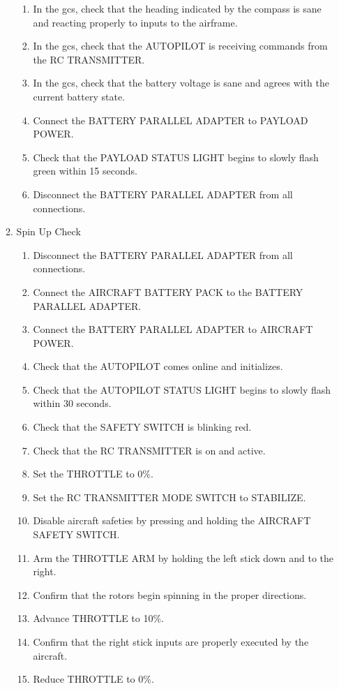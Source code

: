 \documentclass{report}
\begin{document}
\begin{enumerate}
\begin{enumerate}
\begin{enumerate}
							\item In the \gls{gcs}, check that the heading indicated by the compass is sane and reacting properly to inputs to the airframe.
							\item In the \gls{gcs}, check that the AUTOPILOT is receiving commands from the RC TRANSMITTER.
							\item In the \gls{gcs}, check that the battery voltage is sane and agrees with the current battery state.
							\item Connect the BATTERY PARALLEL ADAPTER to PAYLOAD POWER.
							\item Check that the PAYLOAD STATUS LIGHT begins to slowly flash green within 15 seconds.
							\item Disconnect the BATTERY PARALLEL ADAPTER from all connections.
						\end{enumerate}
					\item Spin Up Check
						\begin{enumerate}
							\item Disconnect the BATTERY PARALLEL ADAPTER from all connections.
							\item Connect the AIRCRAFT BATTERY PACK to the BATTERY PARALLEL ADAPTER.
							\item Connect the BATTERY PARALLEL ADAPTER to AIRCRAFT POWER.
							\item Check that the AUTOPILOT comes online and initializes.
							\item Check that the AUTOPILOT STATUS LIGHT begins to slowly flash within 30 seconds.
							\item Check that the SAFETY SWITCH is blinking red.
							\item Check that the RC TRANSMITTER is on and active.
							\item Set the THROTTLE to 0\%.
							\item Set the RC TRANSMITTER MODE SWITCH to STABILIZE.
							\item Disable aircraft safeties by pressing and holding the AIRCRAFT SAFETY SWITCH.
							\item Arm the THROTTLE ARM by holding the left stick down and to the right.
							\item Confirm that the rotors begin spinning in the proper directions.
							\item Advance THROTTLE to 10\%.
							\item Confirm that the right stick inputs are properly executed by the aircraft.
							\item Reduce THROTTLE to 0\%.

\end{enumerate}
\end{enumerate}
\end{enumerate}
\end{document}
